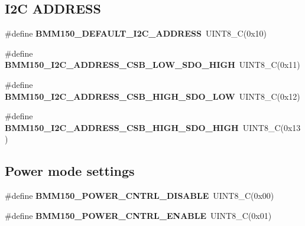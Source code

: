 \subsection*{I2C A\+D\+D\+R\+E\+SS}
\begin{DoxyCompactItemize}
\item 
\mbox{\label{group___b_m_m150_gacec262689d340c2160a64008a669aa17}} 
\#define {\bfseries B\+M\+M150\+\_\+\+D\+E\+F\+A\+U\+L\+T\+\_\+\+I2\+C\+\_\+\+A\+D\+D\+R\+E\+SS}~U\+I\+N\+T8\+\_\+C(0x10)
\item 
\mbox{\label{group___b_m_m150_gac04e274fd3110a712d57a83a66f56574}} 
\#define {\bfseries B\+M\+M150\+\_\+\+I2\+C\+\_\+\+A\+D\+D\+R\+E\+S\+S\+\_\+\+C\+S\+B\+\_\+\+L\+O\+W\+\_\+\+S\+D\+O\+\_\+\+H\+I\+GH}~U\+I\+N\+T8\+\_\+C(0x11)
\item 
\mbox{\label{group___b_m_m150_ga36e8f78f8495e6f498604c2c725c21fd}} 
\#define {\bfseries B\+M\+M150\+\_\+\+I2\+C\+\_\+\+A\+D\+D\+R\+E\+S\+S\+\_\+\+C\+S\+B\+\_\+\+H\+I\+G\+H\+\_\+\+S\+D\+O\+\_\+\+L\+OW}~U\+I\+N\+T8\+\_\+C(0x12)
\item 
\mbox{\label{group___b_m_m150_ga3294feea0bdf7c0f8590e1feddf23906}} 
\#define {\bfseries B\+M\+M150\+\_\+\+I2\+C\+\_\+\+A\+D\+D\+R\+E\+S\+S\+\_\+\+C\+S\+B\+\_\+\+H\+I\+G\+H\+\_\+\+S\+D\+O\+\_\+\+H\+I\+GH}~U\+I\+N\+T8\+\_\+C(0x13)
\end{DoxyCompactItemize}
\subsection*{Power mode settings}
\begin{DoxyCompactItemize}
\item 
\mbox{\label{group___b_m_m150_ga7a5d9c2dd81e018449133ec0271a8469}} 
\#define {\bfseries B\+M\+M150\+\_\+\+P\+O\+W\+E\+R\+\_\+\+C\+N\+T\+R\+L\+\_\+\+D\+I\+S\+A\+B\+LE}~U\+I\+N\+T8\+\_\+C(0x00)
\item 
\mbox{\label{group___b_m_m150_ga8b4324eb9f0ee083a20ef9e328ea227f}} 
\#define {\bfseries B\+M\+M150\+\_\+\+P\+O\+W\+E\+R\+\_\+\+C\+N\+T\+R\+L\+\_\+\+E\+N\+A\+B\+LE}~U\+I\+N\+T8\+\_\+C(0x01)
\end{DoxyCompactItemize}
